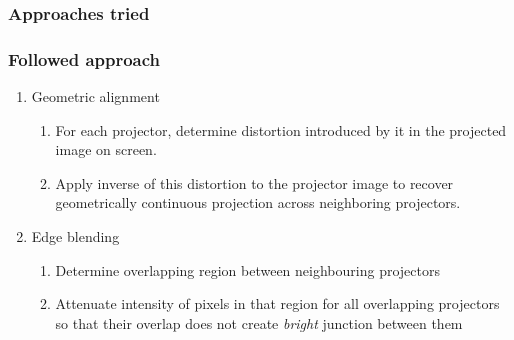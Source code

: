 \documentclass{beamer}
\begin{document}

\begin{frame}
\frametitle{Approaches tried}
\end{frame}




\begin{frame}[label=concept]
\frametitle{Followed approach}
\begin{enumerate}
\item Geometric alignment
\begin{enumerate}
\item For each projector, determine distortion introduced by it in the projected image on screen.
\item Apply inverse of this distortion to the projector image to recover geometrically continuous projection across neighboring projectors.
\end{enumerate}
\item Edge blending
\begin{enumerate}
\item Determine overlapping region between neighbouring projectors
\item Attenuate intensity of pixels in that region for all overlapping projectors so that their overlap does not create \textit{bright} junction between them
\end{enumerate}
\end{enumerate}
\end{frame}
\end{document}
